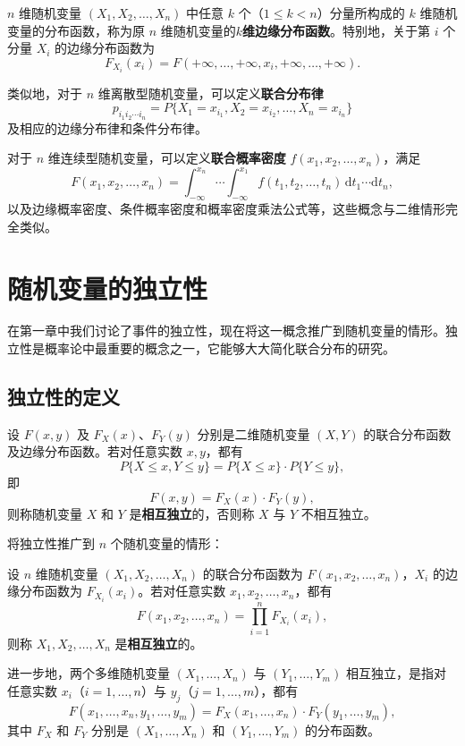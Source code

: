 \documentclass[lang=cn,11pt]{elegantbook}
\begin{document}
\begin{definition}[$n$维边缘分布函数]\label{def:n-marginal-df}
$n$ 维随机变量 $(X_1, X_2, \dots, X_n)$ 中任意 $k$ 个（$1 \leqslant k < n$）分量所构成的 $k$ 维随机变量的分布函数，称为原 $n$ 维随机变量的\textbf{$k$维边缘分布函数}。特别地，关于第 $i$ 个分量 $X_i$ 的边缘分布函数为
\[
F_{X_i}(x_i) = F(+\infty, \dots, +\infty, x_i, +\infty, \dots, +\infty).
\]
\end{definition}

类似地，对于 $n$ 维离散型随机变量，可以定义\textbf{联合分布律} \[p_{i_1 i_2 \cdots i_n} = P\{X_1 = x_{i_1}, X_2 = x_{i_2}, \dots, X_n = x_{i_n}\}\] 及相应的边缘分布律和条件分布律。

对于 $n$ 维连续型随机变量，可以定义\textbf{联合概率密度} $f(x_1, x_2, \dots, x_n)$，满足
\[
F(x_1, x_2, \dots, x_n) = \int_{-\infty}^{x_n}\cdots\int_{-\infty}^{x_1}f(t_1, t_2, \dots, t_n)\,\mathrm{d}t_1\cdots\mathrm{d}t_n,
\]
以及边缘概率密度、条件概率密度和概率密度乘法公式等，这些概念与二维情形完全类似。


\section{随机变量的独立性}

在第一章中我们讨论了事件的独立性，现在将这一概念推广到随机变量的情形。独立性是概率论中最重要的概念之一，它能够大大简化联合分布的研究。

\subsection{独立性的定义}

\begin{definition}[两个随机变量的独立性] \label{def:2d-independence}
设 $F(x,y)$ 及 $F_X(x)$、$F_Y(y)$ 分别是二维随机变量 $(X,Y)$ 的联合分布函数及边缘分布函数。若对任意实数 $x, y$，都有
\[
P\{X \leqslant x, Y \leqslant y\} = P\{X \leqslant x\} \cdot P\{Y \leqslant y\},
\]
即
\[
F(x,y) = F_X(x) \cdot F_Y(y),
\]
则称随机变量 $X$ 和 $Y$ 是\textbf{相互独立}的，否则称 $X$ 与 $Y$ 不相互独立。
\end{definition}

将独立性推广到 $n$ 个随机变量的情形：

\begin{definition}[$n$ 个随机变量的相互独立性] \label{def:n-independence}
设 $n$ 维随机变量 $(X_1, X_2, \dots, X_n)$ 的联合分布函数为 $F(x_1, x_2, \dots, x_n)$，$X_i$ 的边缘分布函数为 $F_{X_i}(x_i)$。若对任意实数 $x_1, x_2, \dots, x_n$，都有
\[
F(x_1, x_2, \dots, x_n) = \prod_{i=1}^{n}F_{X_i}(x_i),
\]
则称 $X_1, X_2, \dots, X_n$ 是\textbf{相互独立}的。

进一步地，两个多维随机变量 $(X_1, \dots, X_n)$ 与 $(Y_1, \dots, Y_m)$ 相互独立，是指对任意实数 $x_i$（$i=1,\dots,n$）与 $y_j$（$j=1,\dots,m$），都有
\[
F(x_1, \dots, x_n, y_1, \dots, y_m) = F_X(x_1, \dots, x_n) \cdot F_Y(y_1, \dots, y_m),
\]
其中 $F_X$ 和 $F_Y$ 分别是 $(X_1, \dots, X_n)$ 和 $(Y_1, \dots, Y_m)$ 的分布函数。
\end{definition}
\end{document}
